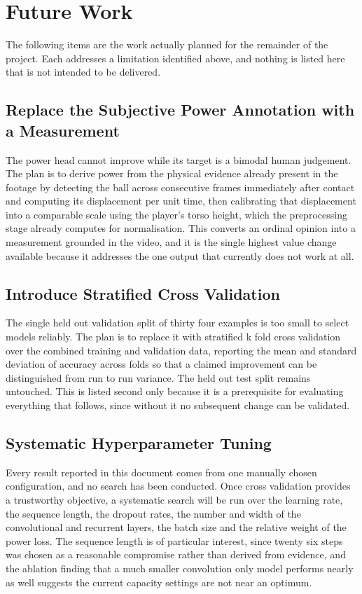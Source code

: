 \section{Future Work}

The following items are the work actually planned for the remainder of the project. Each addresses a limitation identified above, and nothing is listed here that is not intended to be delivered.

\subsection{Replace the Subjective Power Annotation with a Measurement}

The power head cannot improve while its target is a bimodal human judgement. The plan is to derive power from the physical evidence already present in the footage by detecting the ball across consecutive frames immediately after contact and computing its displacement per unit time, then calibrating that displacement into a comparable scale using the player's torso height, which the preprocessing stage already computes for normalisation. This converts an ordinal opinion into a measurement grounded in the video, and it is the single highest value change available because it addresses the one output that currently does not work at all.

\subsection{Introduce Stratified Cross Validation}

The single held out validation split of thirty four examples is too small to select models reliably. The plan is to replace it with stratified k fold cross validation over the combined training and validation data, reporting the mean and standard deviation of accuracy across folds so that a claimed improvement can be distinguished from run to run variance. The held out test split remains untouched. This is listed second only because it is a prerequisite for evaluating everything that follows, since without it no subsequent change can be validated.

\subsection{Systematic Hyperparameter Tuning}

Every result reported in this document comes from one manually chosen configuration, and no search has been conducted. Once cross validation provides a trustworthy objective, a systematic search will be run over the learning rate, the sequence length, the dropout rates, the number and width of the convolutional and recurrent layers, the batch size and the relative weight of the power loss. The sequence length is of particular interest, since twenty six steps was chosen as a reasonable compromise rather than derived from evidence, and the ablation finding that a much smaller convolution only model performs nearly as well suggests the current capacity settings are not near an optimum.

